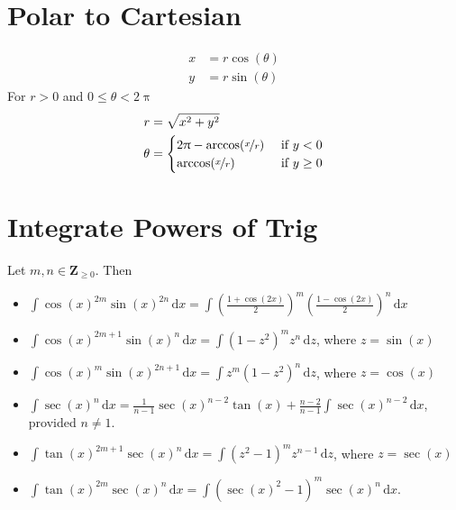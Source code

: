 \documentclass[letterpaper,landscape,9pt,fleqn]{extarticle}
\newcommand{\integers}{\mathbf{Z}}
\begin{document}
\begin{multicols*}{2}
\section*{Polar to Cartesian}
\vspace{-0.25in}
\begin{minipage}[c]{0.25\textwidth}
\begin{align*}
x &= r \cos(\theta) \\
y &= r \sin(\theta)
\end{align*}
For $r > 0$ and $0 \leq \theta < 2 \uppi$
\begin{align*}
r &= \sqrt{x^2 + y^2} \\
\theta &= \begin{cases} 2 \uppi - \arccos(\nicefrac{x}{r})  & \mbox{ if } y < 0  \\
  \arccos(\nicefrac{x}{r})  & \mbox{ if } y \geq 0 
             \end{cases}    
\end{align*}
\end{minipage}      

\section*{Integrate Powers of Trig}
Let $m,n \in \integers_{\geq 0}$. Then

\begin{itemize}[noitemsep]
  \item $\int \cos(x)^{2m} \sin(x)^{2n} \, \mathrm{d}x
         = \int \left(\frac{1+\cos(2 x)}{2}\right)^m 
                 \left(\frac{1-\cos(2 x)}{2}\right)^n 
                 \, \mathrm{d}x$

  \item $\int \cos(x)^{2m+1} \sin(x)^{n} \, \mathrm{d}x
  = \int (1-z^2)^m  z^{n}
             \, \mathrm{d}z$,  where $z = \sin(x)$

  \item $\int \cos(x)^{m} \sin(x)^{2n+1} \, \mathrm{d}x
             = \int z^m (1-z^2)^n \, \mathrm{d}z$,  
             where $z = \cos(x)$

\item $\int \sec(x)^n \, \mathrm{d} x = \frac{1}{n-1} \sec(x)^{n-2} \tan(x) + \frac{n-2}{n-1} \int \sec(x)^{n-2} \, \mathrm{d} x$,
provided $n \neq 1$.
\item $\int \tan(x)^{2m+1} \sec(x)^n \, \mathrm{d} x =  \int (z^2-1)^m z^{n-1} \, \mathrm{d} z$,
where $z=\sec(x)$

\item $\int \tan(x)^{2m} \sec(x)^n \, \mathrm{d} x  = \int (\sec(x)^2-1)^m \sec(x)^n \, \mathrm{d} x$.



\end{itemize}
\end{multicols*}
\end{document}
